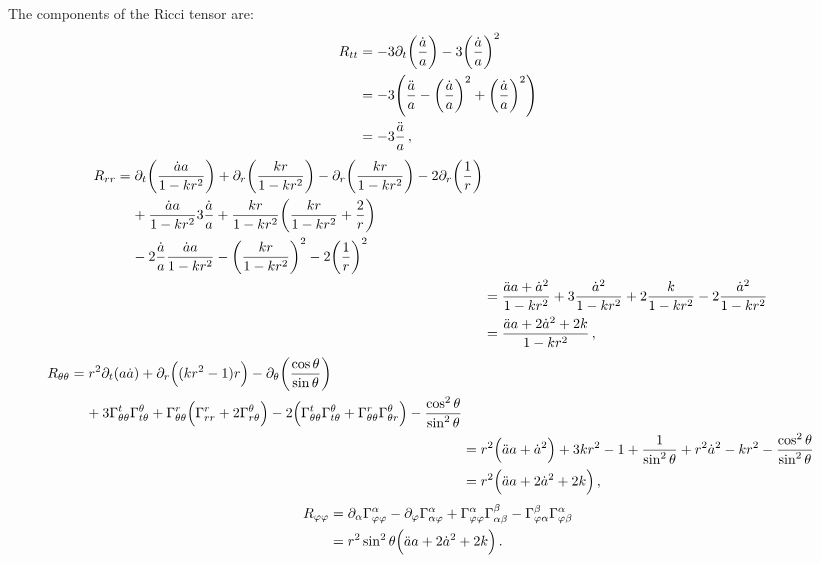 \documentclass[main.tex]{subfiles}
\begin{document}
\begin{claim}
The components of the Ricci tensor are: 
%
\begin{align}
R_{tt} &= - 3 \partial_{t} \qty(\frac{\dot{a}}{a})
- 3 \qty(\frac{\dot{a}}{a})^2  \\
&=-3 \qty(\frac{\ddot{a}}{a} - \qty(\frac{\dot{a}}{a})^2
+ \qty(\frac{\dot{a}}{a})^2)  \\
&= -3 \frac{\ddot{a}}{a}
\,,
\end{align} 
%
\begin{align}
\begin{split}
R_{rr} &= \partial_{t} \qty(\frac{\dot{a} a}{1 - kr^2} )
+ \partial_{r} \qty(\frac{kr}{1 - kr^2})
- \partial_{r} \qty(\frac{kr}{1 - kr^2})
- 2 \partial_{r} \qty(\frac{1}{r}) \\
&\phantom{=}\ 
+ \frac{\dot{a} a}{1 - kr^2} 3 \frac{\dot{a}}{a}
+ \frac{kr}{1-kr^2} \qty(\frac{kr }{1 - kr^2} + \frac{2}{r}) \\
&\phantom{=}\ 
- 2 \frac{\dot{a}}{a} \frac{\dot{a} a}{1 - kr^2}
- \qty(\frac{kr}{1 - kr^2})^2 
- 2 \qty(\frac{1}{r})^2
\end{split}  \\
&= \frac{\ddot{a} a + \dot{a}^2}{1 - kr^2} 
+ 3 \frac{\dot{a}^2}{1 - kr^2}
+ 2 \frac{k}{1 - kr^2}
- 2 \frac{\dot{a}^2}{1 - kr^2}  \\
&= \frac{\ddot{a} a + 2 \dot{a}^2 + 2 k}{1 - kr^2}
\,,
\end{align}
%
\begin{align}
\begin{split}
R_{\theta \theta } &= 
r^2 \partial_{t} \qty(a \dot{a})
+ \partial_{r} \qty((kr^2-1)r)
- \partial_{\theta } \qty(\frac{\cos \theta }{\sin \theta }) \\
&\phantom{=}\ 
+3 \Gamma^{t}_{\theta \theta } \Gamma^{\theta }_{t \theta } + \Gamma^{r}_{\theta \theta } \qty(\Gamma^{r}_{r r } + 2 \Gamma^{\theta }_{r \theta })
-2 \qty(\Gamma^{t}_{\theta \theta } \Gamma^{\theta }_{t \theta } + \Gamma^{r}_{\theta \theta } \Gamma^{\theta }_{\theta r}) - \frac{\cos^2 \theta}{\sin^2\theta }
\end{split}  \\
&= r^2 \qty(\ddot{a} a + \dot{a}^2)
+ 3kr^2 - 1 + \frac{1}{\sin^2\theta} 
+  r^2 \dot{a}^2
- kr^2
- \frac{\cos^2\theta }{\sin^2\theta }  \\
&= r^2 \qty(\ddot{a} a + 2\dot{a}^2 + 2k)
\,,
\end{align} 
%
\begin{align}
R_{ \varphi \varphi } &= \partial_{\alpha } \Gamma^{\alpha }_{\varphi \varphi } - \partial_{\varphi } \Gamma^{\alpha }_{\alpha \varphi } + \Gamma^{\alpha }_{\varphi \varphi } \Gamma^{\beta }_{\alpha \beta } - \Gamma^{\beta }_{\varphi \alpha } \Gamma^{\alpha }_{\varphi \beta }  \\
&= r^2 \sin^2\theta \qty(\ddot{a} a + 2 \dot{a}^2 + 2k) 
\,.
\end{align}
\end{claim}
\end{document}
